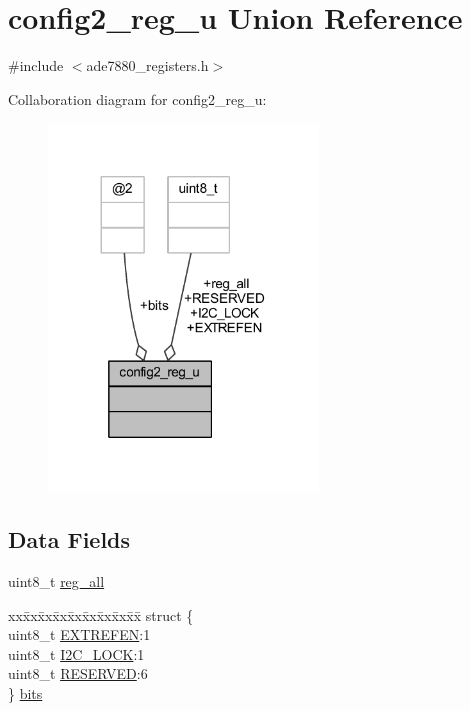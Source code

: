 \hypertarget{a00022}{\section{config2\-\_\-reg\-\_\-u Union Reference}
\label{d7/de0/a00022}
}


{\ttfamily \#include $<$ade7880\-\_\-registers.\-h$>$}



Collaboration diagram for config2\-\_\-reg\-\_\-u\-:\nopagebreak
\begin{figure}[H]
\begin{center}
\leavevmode
\includegraphics[width=203pt]{d4/d63/a00082}
\end{center}
\end{figure}
\subsection*{Data Fields}
\begin{DoxyCompactItemize}
\item 
uint8\-\_\-t \hyperlink{a00022_ab2957613fa7f241407cc98e80676dccf}{reg\-\_\-all}
\item 
\begin{tabbing}
xx\=xx\=xx\=xx\=xx\=xx\=xx\=xx\=xx\=\kill
struct \{\\
\>uint8\_t \hyperlink{a00022_a291582fa01a543f0329ea1758bdafe85}{EXTREFEN}:1\\
\>uint8\_t \hyperlink{a00022_a552928a455bd7e037a3593655c5215e3}{I2C\_LOCK}:1\\
\>uint8\_t \hyperlink{a00022_ad5d4752b467b6c64a9b5fa14d65c71b2}{RESERVED}:6\\
\} \hyperlink{a00022_a73eff37a9b918713343460e37c589b93}{bits}\\

\end{tabbing}\end{DoxyCompactItemize}


